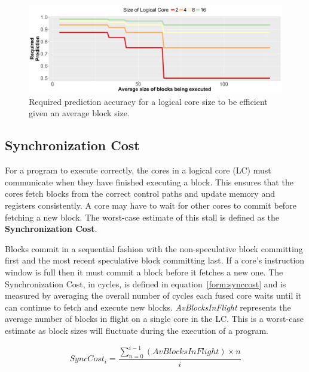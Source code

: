 \begin{figure}[h]
    \centering
    \includegraphics[width=\textwidth]{cases-paper/graphics/limit_study/prediction_req.pdf}
    \caption{Required prediction accuracy for a logical core size to be efficient given an average block size.}
    \label{fig:req_pred}
\end{figure}
\subsection{Synchronization Cost}

For a program to execute correctly, the cores in a logical core (LC) must communicate when they have finished executing a block. 
This ensures that the cores fetch blocks from the correct control paths and update memory and registers consistently.
A core may have to wait for other cores to commit before fetching a new block. 
The worst-case estimate of this stall is defined as the \textbf{Synchronization Cost}.

Blocks commit in a sequential fashion with the non-speculative block committing first and the most recent speculative block committing last.
If a core's instruction window is full then it must commit a block before it fetches a new one.
The Synchronization Cost, in cycles, is defined in equation~\ref{form:synccost} and is measured by averaging the overall number of cycles each fused core waits until it can continue to fetch and execute new blocks.
\textit{AvBlocksInFlight} represents the average number of blocks in flight on a single core in the LC.
This is a worst-case estimate as block sizes will fluctuate during the execution of a program.

\begin{equation}\label{form:synccost}
SyncCost_i = \frac{\sum_{n=0}^{i-1}\left(AvBlocksInFlight \right) \times n }{i}
\end{equation}


